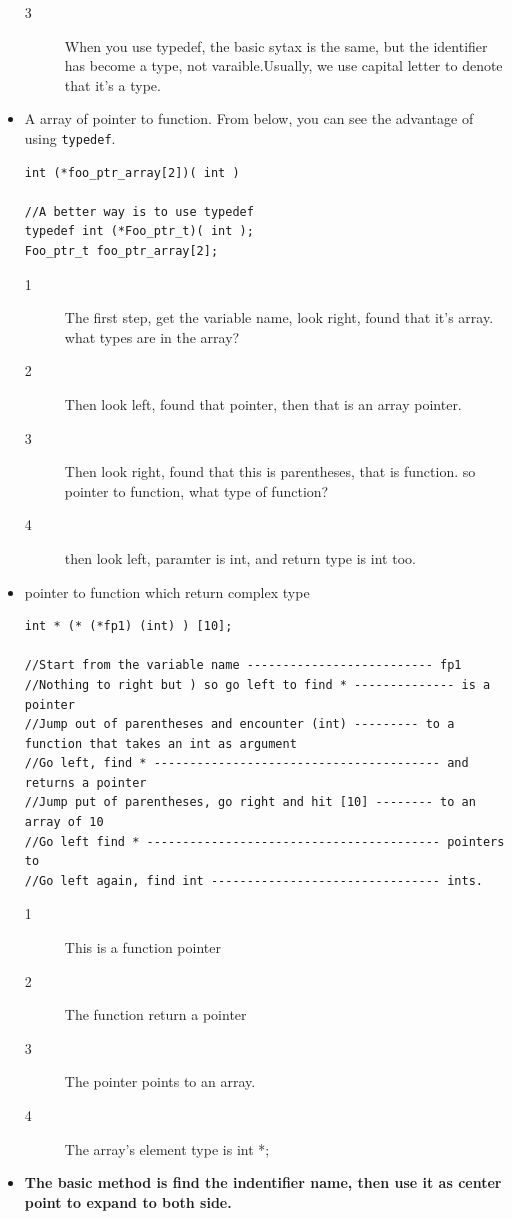 \documentclass[a4paper,11pt,twoside]{book}
\begin{document}
\begin{itemize}
\begin{lstlisting}
\end{lstlisting}
\begin{description}
	\item[3] When you use typedef, the basic sytax is the same, but the identifier has become a type, not varaible.Usually, we use capital letter to denote that it's a type.
\end{description}

\item A array of pointer to function. From below, you can see the advantage of using \texttt{typedef}.
\begin{lstlisting}
int (*foo_ptr_array[2])( int )

//A better way is to use typedef
typedef int (*Foo_ptr_t)( int );
Foo_ptr_t foo_ptr_array[2];
\end{lstlisting}
\begin{description}
	\item[1] The first step, get the variable name, look right, found that it's array. what types are in the array?
	\item[2] Then look left, found that pointer, then that is an array pointer.
	\item[3] Then look right, found that this is parentheses, that is function. so pointer to function, what type of function?
	\item[4] then look left, paramter is int, and return type is int too.
\end{description}


\item pointer to function which return complex type
\begin{lstlisting}
int * (* (*fp1) (int) ) [10];

//Start from the variable name -------------------------- fp1
//Nothing to right but ) so go left to find * -------------- is a pointer
//Jump out of parentheses and encounter (int) --------- to a function that takes an int as argument
//Go left, find * ---------------------------------------- and returns a pointer
//Jump put of parentheses, go right and hit [10] -------- to an array of 10
//Go left find * ----------------------------------------- pointers to
//Go left again, find int -------------------------------- ints.
\end{lstlisting}
\begin{description}
	\item[1] This is a function pointer
	\item[2] The function return a pointer 
	\item[3] The pointer points to an array. 
	\item[4] The array's element type is int *; 
\end{description}
\item \textbf{The basic method is find the indentifier name, then use it as center point to expand to both side.}


\end{itemize}
\end{document}
